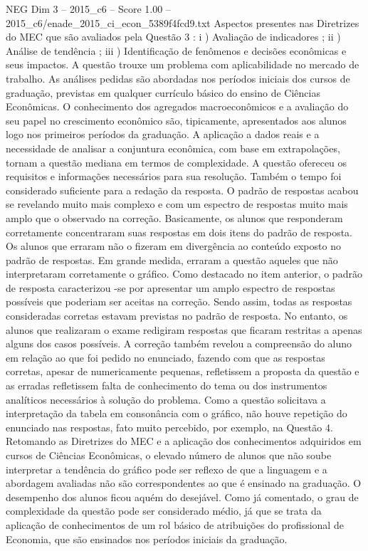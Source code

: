 \begin{textsample}{NEG Dim 3 – 2015\_c6 – Score 1.00 – 2015\_c6/enade\_2015\_ci\_econ\_5389f4fcd9.txt}
Aspectos presentes nas Diretrizes do MEC que são avaliados pela Questão 3 : i ) Avaliação de indicadores ; ii ) Análise de tendência ; iii ) Identificação de fenômenos e decisões econômicas e seus impactos.
A questão trouxe um problema com aplicabilidade no mercado de trabalho.
As análises pedidas são abordadas nos períodos iniciais dos cursos de graduação, previstas em qualquer currículo básico do ensino de Ciências Econômicas.
O conhecimento dos agregados macroeconômicos e a avaliação do seu papel no crescimento econômico são, tipicamente, apresentados aos alunos logo nos primeiros períodos da graduação.
A aplicação a dados reais e a necessidade de analisar a conjuntura econômica, com base em extrapolações, tornam a questão mediana em termos de complexidade.
A questão ofereceu os requisitos e informações necessários para sua resolução.
Também o tempo foi considerado suficiente para a redação da resposta.
O padrão de respostas acabou se revelando muito mais complexo e com um espectro de respostas muito mais amplo que o observado na correção.
Basicamente, os alunos que responderam corretamente concentraram suas respostas em dois itens do padrão de resposta.
Os alunos que erraram não o fizeram em divergência ao conteúdo exposto no padrão de respostas.
Em grande medida, erraram a questão aqueles que não interpretaram corretamente o gráfico.
Como destacado no item anterior, o padrão de resposta caracterizou -se por apresentar um amplo espectro de respostas possíveis que poderiam ser aceitas na correção.
Sendo assim, todas as respostas consideradas corretas estavam previstas no padrão de resposta.
No entanto, os alunos que realizaram o exame redigiram respostas que ficaram restritas a apenas alguns dos casos possíveis.
A correção também revelou a compreensão do aluno em relação ao que foi pedido no enunciado, fazendo com que as respostas corretas, apesar de numericamente pequenas, refletissem a proposta da questão e as erradas refletissem falta de conhecimento do tema ou dos instrumentos analíticos necessários à solução do problema.
Como a questão solicitava a interpretação da tabela em consonância com o gráfico, não houve repetição do enunciado nas respostas, fato muito percebido, por exemplo, na Questão 4.
Retomando as Diretrizes do MEC e a aplicação dos conhecimentos adquiridos em cursos de Ciências Econômicas, o elevado número de alunos que não soube interpretar a tendência do gráfico pode ser reflexo de que a linguagem e a abordagem avaliadas não são correspondentes ao que é ensinado na graduação.
O desempenho dos alunos ficou aquém do desejável.
Como já comentado, o grau de complexidade da questão pode ser considerado médio, já que se trata da aplicação de conhecimentos de um rol básico de atribuições do profissional de Economia, que são ensinados nos períodos iniciais da graduação.

\end{textsample}
